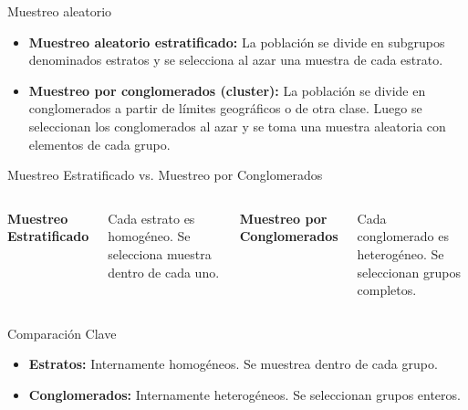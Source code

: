 \documentclass{beamer}
\begin{document}
\begin{frame}{Muestreo aleatorio}
\begin{itemize}
    \item {\bf Muestreo aleatorio estratificado:} La población se divide en subgrupos denominados estratos y se selecciona al azar una muestra de cada estrato.
    \item {\bf  Muestreo por conglomerados (cluster):} La población se divide en conglomerados a partir de límites geográficos o de otra clase. Luego se seleccionan los conglomerados al azar y se toma una muestra aleatoria con elementos de cada grupo. 
\end{itemize}
 \end{frame}   



\begin{frame}{Muestreo Estratificado vs. Muestreo por Conglomerados}
\begin{columns}
\centering
\textbf{Muestreo Estratificado} \\[1ex]

\vspace{1ex}
\scriptsize
Cada estrato es homogéneo. Se selecciona muestra dentro de cada uno.

\centering
\textbf{Muestreo por Conglomerados} \\[1ex]

\vspace{1ex}
\scriptsize
Cada conglomerado es heterogéneo. Se seleccionan grupos completos.
\end{columns}

\vspace{1ex}
\begin{block}{Comparación Clave}
\begin{itemize}
    \item \textbf{Estratos:} Internamente homogéneos. Se muestrea dentro de cada grupo.
    \item \textbf{Conglomerados:} Internamente heterogéneos. Se seleccionan grupos enteros.
\end{itemize}
\end{block}
\end{frame}
\end{document}
